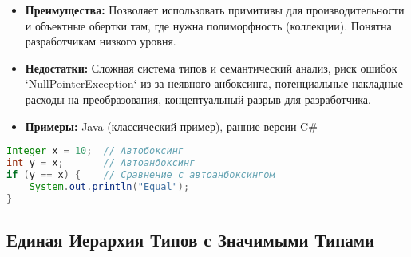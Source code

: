 \begin{itemize}[label={--}]
    \item \textbf{Преимущества:}
    Позволяет использовать примитивы для производительности и объектные обертки там, где нужна полиморфность (коллекции). Понятна разработчикам низкого уровня.

    \item \textbf{Недостатки:} Сложная система типов и семантический анализ, риск ошибок `NullPointerException` из-за неявного анбоксинга, потенциальные накладные расходы на преобразования, концептуальный разрыв для разработчика.

    \item \textbf{Примеры:} Java (классический пример), ранние версии C\#
\end{itemize}

\newpage

\begin{lstlisting}[language=java,title=Пример в Java]
Integer x = 10;  // Автобоксинг
int y = x;       // Автоанбоксинг
if (y == x) {    // Сравнение с автоанбоксингом
    System.out.println("Equal");
}
\end{lstlisting}

\subsection{Единая Иерархия Типов с Значимыми Типами}

